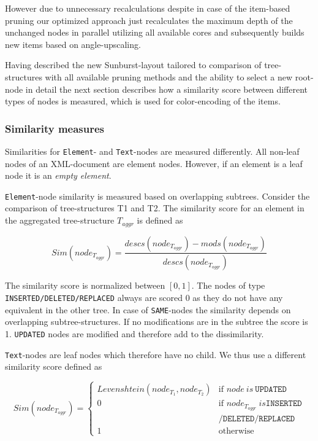 However due to unnecessary recalculations despite in case of the item-based pruning our optimized approach just recalculates the maximum depth of the unchanged nodes in parallel utilizing all available cores and subsequently builds new items based on angle-upscaling.

Having described the new Sunburst-layout tailored to comparison of tree-structures with all available pruning methods and the ability to select a new root-node in detail the next section describes how a similarity score between different types of nodes is measured, which is used for color-encoding of the items.

\subsubsection{Similarity measures}
Similarities for \texttt{Element}- and \texttt{Text}-nodes are measured differently. All non-leaf nodes of an XML-document are element nodes. However, if an element is a leaf node it is an \emph{empty element}.

\texttt{Element}-node similarity is measured based on overlapping subtrees. Consider the comparison of tree-structures T1 and T2. The similarity score for an element in the aggregated tree-structure $T_{aggr}$ is defined as

\begin{equation}
Sim(node_{T_{aggr}}) = \frac{descs(node_{T_{aggr}}) - mods(node_{T_{aggr}})}{descs(node_{T_{aggr}})}
\end{equation}

The similarity score is normalized between $[0, 1]$. The nodes of type\\ \texttt{INSERTED/DELETED/REPLACED} always are scored 0 as they do not have any equivalent in the other tree. In case of \texttt{SAME}-nodes the similarity depends on overlapping subtree-structures. If no modifications are in the subtree the score is 1. \texttt{UPDATED} nodes are modified and therefore add to the dissimilarity.

\texttt{Text}-nodes are leaf nodes which therefore have no child. We thus use a different similarity score defined as

\begin{equation}
Sim(node_{T_{aggr}}) = \left\{ \begin{array}{cl}
Levenshtein(node_{T_{1}}, node_{T_{2}}) & \textrm{if }node\ is\ \texttt{UPDATED}\\
0 & \textrm{if }node_{T_{aggr}}\ is \texttt{INSERTED}\\
  & \texttt{/DELETED/REPLACED}\\
1 & \textrm{otherwise}\end{array}\right.
\end{equation}

